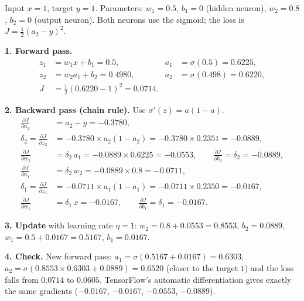 \begin{example}
Input $x=1$, target $y=1$. Parameters: $w_1=0.5$, $b_1=0$ (hidden neuron), $w_2=0.8$, $b_2=0$ (output neuron). Both neurons use the sigmoid; the loss is $J=\frac12(a_2-y)^2$.

\medskip
\textbf{1. Forward pass.}
\begin{align*}
z_1&=w_1x+b_1=0.5, & a_1&=\sigma(0.5)=0.6225,\\
z_2&=w_2a_1+b_2=0.4980, & a_2&=\sigma(0.498)=0.6220,\\
J&=\tfrac12(0.6220-1)^2=\mathbf{0.0714}.
\end{align*}

\textbf{2. Backward pass (chain rule).} Use $\sigma'(z)=a(1-a)$.
\begin{align*}
\frac{\partial J}{\partial a_2}&=a_2-y=-0.3780,\\
\delta_2=\frac{\partial J}{\partial z_2}&=-0.3780\times a_2(1-a_2)=-0.3780\times0.2351=-0.0889,\\
\frac{\partial J}{\partial w_2}&=\delta_2\,a_1=-0.0889\times0.6225=-0.0553,\qquad \frac{\partial J}{\partial b_2}=\delta_2=-0.0889,\\
\frac{\partial J}{\partial a_1}&=\delta_2\,w_2=-0.0889\times0.8=-0.0711,\\
\delta_1=\frac{\partial J}{\partial z_1}&=-0.0711\times a_1(1-a_1)=-0.0711\times0.2350=-0.0167,\\
\frac{\partial J}{\partial w_1}&=\delta_1\,x=-0.0167,\qquad \frac{\partial J}{\partial b_1}=\delta_1=-0.0167.
\end{align*}

\textbf{3. Update} with learning rate $\eta=1$: $w_2=0.8+0.0553=0.8553$, $b_2=0.0889$, $w_1=0.5+0.0167=0.5167$, $b_1=0.0167$.

\medskip
\textbf{4. Check.} New forward pass: $a_1=\sigma(0.5167+0.0167)=0.6303$, $a_2=\sigma(0.8553\times0.6303+0.0889)=0.6520$ (closer to the target $1$) and the loss falls from $0.0714$ to $\mathbf{0.0605}$. TensorFlow's automatic differentiation gives exactly the same gradients ($-0.0167$, $-0.0167$, $-0.0553$, $-0.0889$).
\end{example}

